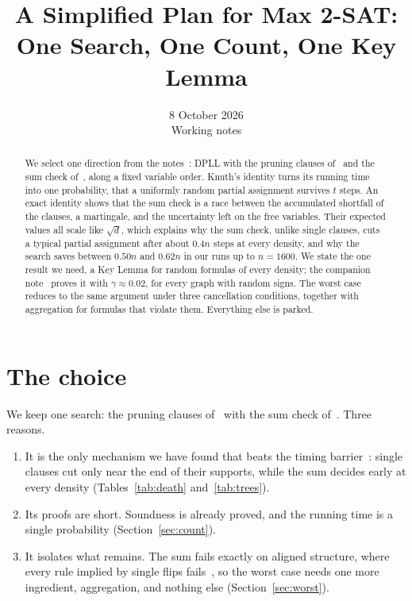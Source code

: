 \documentclass[11pt,a4paper]{article}
\title{A Simplified Plan for Max 2-SAT:\\ One Search, One Count, One Key Lemma}
\author{}
\date{8 October 2026\\[3pt]\small Working notes}
\theoremstyle{definition}
\theoremstyle{remark}
\begin{document}
\maketitle

\begin{abstract}
We select one direction from the notes~\cite{N3,N4,N5,N6}: DPLL with the
pruning clauses of~\cite{N3} and the sum check of~\cite{N4}, along a fixed
variable order. Knuth's identity turns its running time into one probability,
that a uniformly random partial assignment survives $t$ steps. An exact
identity shows that the sum check is a race between the accumulated shortfall
of the clauses, a martingale, and the uncertainty left on the free variables.
Their expected values all scale like $\sqrt d$, which explains why the sum
check, unlike single clauses, cuts a typical partial assignment after about
$0.4n$ steps at every density, and why the search saves between $0.50n$ and
$0.62n$ in our runs up to $n=1600$. We state the one result we need, a Key
Lemma for random formulas of every density; the companion note~\cite{N8}
proves it with $\gamma\approx0.02$, for every graph with random signs. The
worst case reduces to the same argument under three cancellation conditions,
together with aggregation for formulas that violate them. Everything else is
parked.
\end{abstract}

\section{The choice}\label{sec:choice}

We keep one search: the pruning clauses of~\cite{N3} with the sum check
of~\cite{N4}. Three reasons.
\begin{enumerate}
 \item It is the only mechanism we have found that beats the timing
 barrier~\cite[Remark~29]{N3}: single clauses cut only near the end of their
 supports, while the sum decides early at every density (Tables~\ref{tab:death}
 and~\ref{tab:trees}).
 \item Its proofs are short. Soundness is already proved, and the running
 time is a single probability (Section~\ref{sec:count}).
 \item It isolates what remains. The sum fails exactly on aligned structure,
 where every rule implied by single flips fails~\cite[Section~9]{N4}, so the
 worst case needs one more ingredient, aggregation, and nothing else
 (Section~\ref{sec:worst}).
\end{enumerate}
\end{document}
